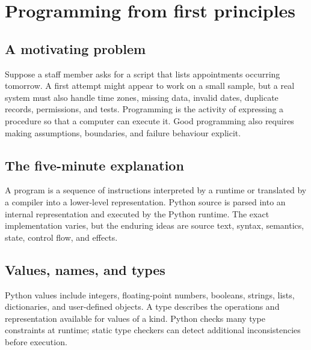\chapter{Programming from first principles}
\label{ch:programming}

\section{A motivating problem}
Suppose a staff member asks for a script that lists appointments occurring tomorrow. A first attempt might appear to work on a small sample, but a real system must also handle time zones, missing data, invalid dates, duplicate records, permissions, and tests. Programming is the activity of expressing a procedure so that a computer can execute it. Good programming also requires making assumptions, boundaries, and failure behaviour explicit.


\section{The five-minute explanation}
A program is a sequence of instructions interpreted by a runtime or translated by a compiler into a lower-level representation. Python source is parsed into an internal representation and executed by the Python runtime. The exact implementation varies, but the enduring ideas are source text, syntax, semantics, state, control flow, and effects.


\section{Values, names, and types}
Python values include integers, floating-point numbers, booleans, strings, lists, dictionaries, and user-defined objects. A type describes the operations and representation available for values of a kind. Python checks many type constraints at runtime; static type checkers can detect additional inconsistencies before execution.


